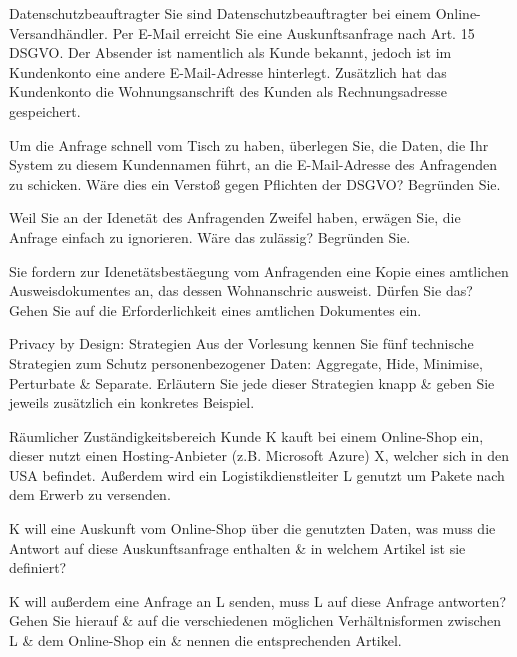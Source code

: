 \documentclass{exercisesheet}
\begin{document}
\begin{exercise*}{Datenschutzbeauftragter}{
    Sie sind Datenschutzbeauftragter bei einem Online-Versandhändler. Per E-Mail erreicht Sie eine Auskunftsanfrage nach Art. 15 DSGVO. Der Absender ist namentlich als Kunde bekannt, jedoch ist im Kundenkonto eine andere E-Mail-Adresse hinterlegt. Zusätzlich hat das Kundenkonto die Wohnungsanschrift des Kunden als Rechnungsadresse gespeichert.
  }
  \item Um die Anfrage schnell vom Tisch zu haben, überlegen Sie, die Daten, die Ihr System zu diesem Kundennamen führt, an die E-Mail-Adresse des Anfragenden zu schicken. Wäre dies ein Verstoß gegen Pflichten der DSGVO? Begründen Sie.
  \item Weil Sie an der Idenetät des Anfragenden Zweifel haben, erwägen Sie, die Anfrage einfach zu ignorieren. Wäre das zulässig? Begründen Sie.
  \item Sie fordern zur Idenetätsbestäegung vom Anfragenden eine Kopie eines amtlichen Ausweisdokumentes an, das dessen Wohnanschric ausweist. Dürfen Sie das? Gehen Sie auf die Erforderlichkeit eines amtlichen Dokumentes ein.
\end{exercise*}

\begin{exercise}{Privacy by Design: Strategien}
  Aus der Vorlesung kennen Sie fünf technische Strategien zum Schutz personenbezogener Daten: Aggregate, Hide, Minimise, Perturbate \& Separate.
  Erläutern Sie jede dieser Strategien knapp \& geben Sie jeweils zusätzlich ein konkretes Beispiel.
\end{exercise}

\begin{exercise*}{Räumlicher Zuständigkeitsbereich}{
    Kunde K kauft bei einem Online-Shop ein, dieser nutzt einen Hosting-Anbieter (z.B. Microsoft Azure) X, welcher sich in den USA befindet. Außerdem wird ein Logistikdienstleiter L genutzt um Pakete nach dem Erwerb zu versenden.
  }
  \item K will eine Auskunft vom Online-Shop über die genutzten Daten, was muss die Antwort auf diese Auskunftsanfrage enthalten \& in welchem Artikel ist sie definiert?
  \item K will außerdem eine Anfrage an L senden, muss L auf diese Anfrage antworten? Gehen Sie hierauf \& auf die verschiedenen möglichen Verhältnisformen zwischen L \& dem Online-Shop ein \& nennen die entsprechenden Artikel.
\end{exercise*}
\end{document}
